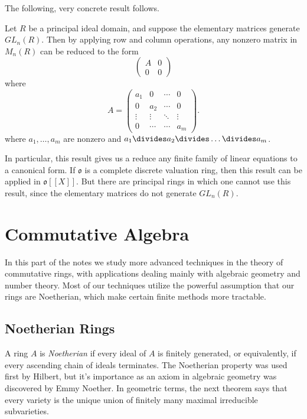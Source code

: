 The following, very concrete result follows.

\begin{theorem}
    Let $R$ be a principal ideal domain, and suppose the elementary matrices generate $GL_n(R)$. Then by applying row and column operations, any nonzero matrix in $M_n(R)$ can be reduced to the form
    \[ \begin{pmatrix}
            A & 0 \\ 0 & 0
    \end{pmatrix} \]
    where
    \[ A = \begin{pmatrix} a_1 & 0 & \cdots & 0 \\ 0 & a_2 & \cdots & 0 \\ \vdots & \vdots & \ddots & \vdots \\ 0 & \cdots & \cdots & a_m \end{pmatrix}. \]
    where $a_1,\dots,a_m$ are nonzero and $a_1 \divides a_2 \divides \dots \divides a_m$.
\end{theorem}

In particular, this result gives us a reduce any finite family of linear equations to a canonical form. If $\mathfrak{o}$ is a complete discrete valuation ring, then this result can be applied in $\mathfrak{o}[[X]]$. But there are principal rings in which one cannot use this result, since the elementary matrices do not generate $GL_n(R)$.




\part{Commutative Algebra}

In this part of the notes we study more advanced techniques in the theory of commutative rings, with applications dealing mainly with algebraic geometry and number theory. Most of our techniques utilize the powerful assumption that our rings are Noetherian, which make certain finite methods more tractable.

\chapter{Noetherian Rings}

A ring $A$ is \emph{Noetherian} if every ideal of $A$ is finitely generated, or equivalently, if every ascending chain of ideals terminates. The Noetherian property was used first by Hilbert, but it's importance as an axiom in algebraic geometry was discovered by Emmy Noether. In geometric terms, the next theorem says that every variety is the unique union of finitely many maximal irreducible subvarieties.

